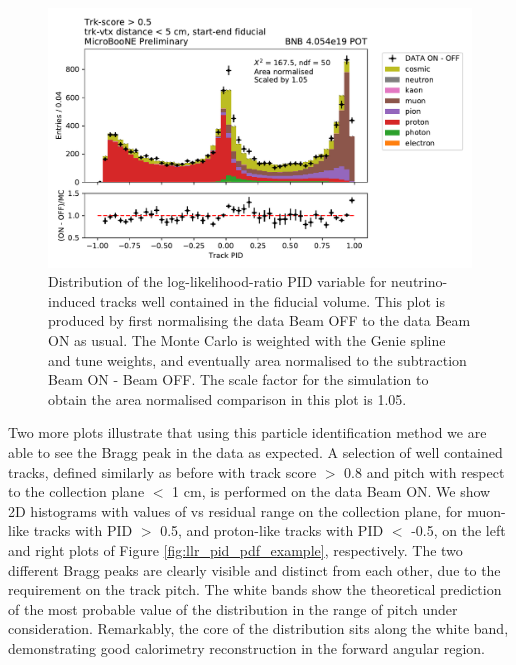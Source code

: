\begin{figure}[H] 
    \centering
    \includegraphics[width=1.0\textwidth]{llrpid/llr_012_n_area_norm.pdf}
    \caption{Distribution of the log-likelihood-ratio PID variable for neutrino-induced tracks well contained in the fiducial volume. This plot is produced by first normalising the data Beam OFF to the data Beam ON as usual. The Monte Carlo is weighted with the Genie spline and tune weights, and eventually area normalised to the subtraction Beam ON - Beam OFF. The scale factor for the simulation to obtain the area normalised comparison in this plot is 1.05.}
    \label{fig:llr_pid_uvy_example}
\end{figure}

Two more plots illustrate that using this particle identification method we are able to see the Bragg peak in the data as expected.
A selection of well contained tracks, defined similarly as before with track score $>$ 0.8 and pitch with respect to the collection plane $<$ 1 cm, is performed on the data Beam ON.
We show 2D histograms with values of \dedx vs residual range on the collection plane, for muon-like tracks with PID $>$ 0.5, and proton-like tracks with PID $<$ -0.5, on the left and right plots of Figure \ref{fig:llr_pid_pdf_example}, respectively.
The two different Bragg peaks are clearly visible and distinct from each other, due to the requirement on the track pitch.
The white bands show the theoretical prediction of the most probable value of the \dedx distribution in the range of pitch under consideration.
Remarkably, the core of the distribution sits along the white band, demonstrating good calorimetry reconstruction in the forward angular region.

